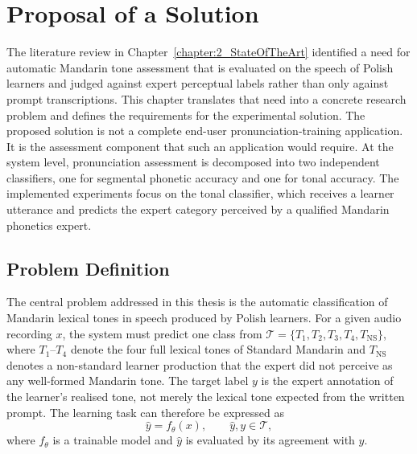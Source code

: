 
\chapter{Proposal of a Solution}\label{chapter:3_Proposal}

The literature review in Chapter~\ref{chapter:2_StateOfTheArt} identified a
need for automatic Mandarin tone assessment that is evaluated on the speech of
Polish learners and judged against expert perceptual labels rather than only
against prompt transcriptions. This chapter translates that need into a concrete
research problem and defines the requirements for the experimental solution. The
proposed solution is not a complete end-user pronunciation-training application.
It is the assessment component that such an application would require. At the
system level, pronunciation assessment is decomposed into two independent
classifiers, one for segmental phonetic accuracy and one for tonal accuracy. The
implemented experiments focus on the tonal classifier, which receives a learner
utterance and predicts the expert category perceived by a qualified Mandarin
phonetics expert.

\section{Problem Definition}
\label{sec:proposal:problem}

The central problem addressed in this thesis is the automatic classification of
Mandarin lexical tones in speech produced by Polish learners. For a given audio
recording \(x\), the system must predict one class from
\(\mathcal{T}=\{T_1,T_2,T_3,T_4,T_{\mathrm{NS}}\}\), where
\(T_1\)--\(T_4\) denote the four full lexical tones of Standard Mandarin and
\(T_{\mathrm{NS}}\) denotes a non-standard learner production that the expert did
not perceive as any well-formed Mandarin tone. The target label \(y\) is the
expert annotation of the learner's realised tone, not merely the lexical tone
expected from the written prompt. The learning task can therefore be expressed as
\begin{equation}
  \hat{y}=f_{\theta}(x), \qquad \hat{y},y \in \mathcal{T},
  \label{eq:proposal:classification_problem}
\end{equation}
where \(f_{\theta}\) is a trainable model and \(\hat{y}\) is evaluated by its
agreement with \(y\).

